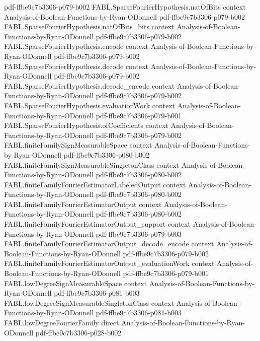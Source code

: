 \begin{theorem}
  {pdf-ffbe9c7b3306-p079-b002}
\proofstep
  {FABL.SparseFourierHypothesis.natOfBits}
  {context}
  {Analysis-of-Boolean-Functions-by-Ryan-ODonnell}
  {pdf-ffbe9c7b3306-p079-b002}
\proofstep
  {FABL.SparseFourierHypothesis.natOfBits_bits}
  {context}
  {Analysis-of-Boolean-Functions-by-Ryan-ODonnell}
  {pdf-ffbe9c7b3306-p079-b002}
\proofstep
  {FABL.SparseFourierHypothesis.encode}
  {context}
  {Analysis-of-Boolean-Functions-by-Ryan-ODonnell}
  {pdf-ffbe9c7b3306-p079-b002}
\proofstep
  {FABL.SparseFourierHypothesis.decode}
  {context}
  {Analysis-of-Boolean-Functions-by-Ryan-ODonnell}
  {pdf-ffbe9c7b3306-p079-b002}
\proofstep
  {FABL.SparseFourierHypothesis.decode_encode}
  {context}
  {Analysis-of-Boolean-Functions-by-Ryan-ODonnell}
  {pdf-ffbe9c7b3306-p079-b002}
\proofstep
  {FABL.SparseFourierHypothesis.evaluationWork}
  {context}
  {Analysis-of-Boolean-Functions-by-Ryan-ODonnell}
  {pdf-ffbe9c7b3306-p079-b001}
\proofstep
  {FABL.SparseFourierHypothesis.ofCoefficients}
  {context}
  {Analysis-of-Boolean-Functions-by-Ryan-ODonnell}
  {pdf-ffbe9c7b3306-p079-b002}
\proofstep
  {FABL.finiteFamilySignMeasurableSpace}
  {context}
  {Analysis-of-Boolean-Functions-by-Ryan-ODonnell}
  {pdf-ffbe9c7b3306-p080-b002}
\proofstep
  {FABL.finiteFamilySignMeasurableSingletonClass}
  {context}
  {Analysis-of-Boolean-Functions-by-Ryan-ODonnell}
  {pdf-ffbe9c7b3306-p080-b002}
\proofstep
  {FABL.finiteFamilyFourierEstimatorLabeledOutput}
  {context}
  {Analysis-of-Boolean-Functions-by-Ryan-ODonnell}
  {pdf-ffbe9c7b3306-p080-b002}
\proofstep
  {FABL.finiteFamilyFourierEstimatorOutput}
  {context}
  {Analysis-of-Boolean-Functions-by-Ryan-ODonnell}
  {pdf-ffbe9c7b3306-p080-b002}
\proofstep
  {FABL.finiteFamilyFourierEstimatorOutput_support}
  {context}
  {Analysis-of-Boolean-Functions-by-Ryan-ODonnell}
  {pdf-ffbe9c7b3306-p079-b003}
\proofstep
  {FABL.finiteFamilyFourierEstimatorOutput_decode_encode}
  {context}
  {Analysis-of-Boolean-Functions-by-Ryan-ODonnell}
  {pdf-ffbe9c7b3306-p079-b002}
\proofstep
  {FABL.finiteFamilyFourierEstimatorOutput_evaluationWork}
  {context}
  {Analysis-of-Boolean-Functions-by-Ryan-ODonnell}
  {pdf-ffbe9c7b3306-p079-b001}
\proofstep
  {FABL.lowDegreeSignMeasurableSpace}
  {context}
  {Analysis-of-Boolean-Functions-by-Ryan-ODonnell}
  {pdf-ffbe9c7b3306-p081-b003}
\proofstep
  {FABL.lowDegreeSignMeasurableSingletonClass}
  {context}
  {Analysis-of-Boolean-Functions-by-Ryan-ODonnell}
  {pdf-ffbe9c7b3306-p081-b003}
\proofstep
  {FABL.lowDegreeFourierFamily}
  {direct}
  {Analysis-of-Boolean-Functions-by-Ryan-ODonnell}
  {pdf-ffbe9c7b3306-p028-b002}

\end{theorem}
